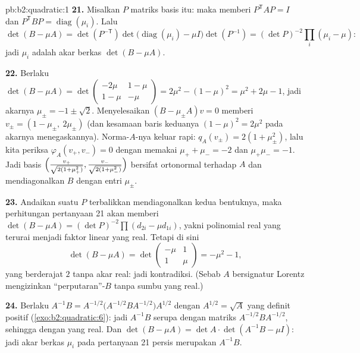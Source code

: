 \begin{solution}{pb:b2:quadratic:1}
\textbf{21.} Misalkan $P$ matriks basis itu: maka 
memberi $P^{\mathsf T}AP = I$ dan $P^{\mathsf T}BP =
\operatorname{diag}(\mu_i)$. Lalu
\[
\det(B - \mu A) = \det(P^{-\mathsf T})
\det\bigl(\operatorname{diag}(\mu_i) - \mu I\bigr)
\det(P^{-1})
= (\det P)^{-2}\prod_i(\mu_i - \mu) :
\]
jadi $\mu_i$ adalah akar berkas $\det(B - \mu A)$.

\textbf{22.} Berlaku $\det(B - \mu A) =
\det\begin{pmatrix} -2\mu & 1-\mu\\ 1-\mu & -\mu\end{pmatrix}
= 2\mu^2 - (1-\mu)^2 = \mu^2 + 2\mu - 1$, jadi akarnya $\mu_\pm = -1
\pm \sqrt2$. Menyelesaikan $(B - \mu_\pm A)v = 0$ memberi $v_\pm = (1 -
\mu_\pm,\ 2\mu_\pm)$ (dan kesamaan baris keduanya $(1-\mu)^2 =
2\mu^2$ pada akarnya menegaskannya). Norma-$A$-nya keluar
rapi: $q_A(v_\pm) = 2(1 + \mu_\pm^2)$, lalu kita periksa
$\varphi_A(v_+, v_-) = 0$ dengan memakai $\mu_+ + \mu_- = -2$ dan
$\mu_+\mu_- = -1$. Jadi basis $\Bigl(\frac{v_+}{\sqrt{2(1 +
\mu_+^2)}}, \frac{v_-}{\sqrt{2(1+\mu_-^2)}}\Bigr)$ bersifat
ortonormal terhadap $A$ dan mendiagonalkan $B$ dengan entri
$\mu_\pm$.

\textbf{23.} Andaikan suatu $P$ terbalikkan mendiagonalkan kedua bentuknya,
maka perhitungan pertanyaan 21 akan memberi $\det(B - \mu A) = (\det
P)^{-2}\prod(d_{2i} - \mu d_{1i})$, yakni polinomial real yang terurai
menjadi faktor linear yang real. Tetapi di sini
\[
\det(B - \mu A) = \det\begin{pmatrix} -\mu & 1\\ 1 &
\mu\end{pmatrix} = -\mu^2 - 1 ,
\]
yang berderajat $2$ tanpa akar real: jadi kontradiksi. (Sebab
$A$ bersignatur Lorentz mengizinkan ``perputaran''-$B$ tanpa sumbu
yang real.)

\textbf{24.} Berlaku $A^{-1}B = A^{-1/2}\bigl(A^{-1/2}BA^{-1/2}\bigr)
A^{1/2}$ dengan $A^{1/2} = \sqrt A$ yang definit positif
(\cref{exo:b2:quadratic:6}): jadi $A^{-1}B$ serupa dengan
matriks \emph{} $A^{-1/2}BA^{-1/2}$, sehingga  dengan
 yang real. Dan $\det(B - \mu A) = \det A\cdot
\det(A^{-1}B - \mu I)$: jadi akar berkas $\mu_i$ pada pertanyaan
21 persis merupakan  $A^{-1}B$.


\end{solution}

